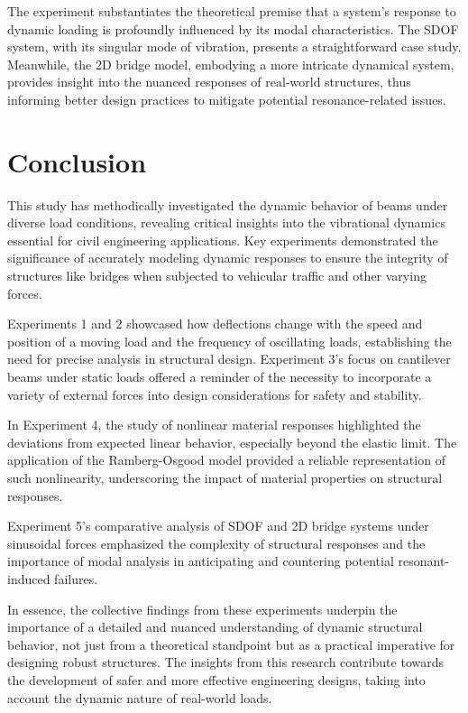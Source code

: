 \documentclass[conference]{IEEEtran}
\begin{document}
The experiment substantiates the theoretical premise that a system's response to dynamic loading is profoundly influenced by its modal characteristics. The SDOF system, with its singular mode of vibration, presents a straightforward case study. Meanwhile, the 2D bridge model, embodying a more intricate dynamical system, provides insight into the nuanced responses of real-world structures, thus informing better design practices to mitigate potential resonance-related issues.


\section{Conclusion}
This study has methodically investigated the dynamic behavior of beams under diverse load conditions, revealing critical insights into the vibrational dynamics essential for civil engineering applications. Key experiments demonstrated the significance of accurately modeling dynamic responses to ensure the integrity of structures like bridges when subjected to vehicular traffic and other varying forces.

Experiments 1 and 2 showcased how deflections change with the speed and position of a moving load and the frequency of oscillating loads, establishing the need for precise analysis in structural design. Experiment 3's focus on cantilever beams under static loads offered a reminder of the necessity to incorporate a variety of external forces into design considerations for safety and stability.

In Experiment 4, the study of nonlinear material responses highlighted the deviations from expected linear behavior, especially beyond the elastic limit. The application of the Ramberg-Osgood model provided a reliable representation of such nonlinearity, underscoring the impact of material properties on structural responses.

Experiment 5's comparative analysis of SDOF and 2D bridge systems under sinusoidal forces emphasized the complexity of structural responses and the importance of modal analysis in anticipating and countering potential resonant-induced failures.

In essence, the collective findings from these experiments underpin the importance of a detailed and nuanced understanding of dynamic structural behavior, not just from a theoretical standpoint but as a practical imperative for designing robust structures. The insights from this research contribute towards the development of safer and more effective engineering designs, taking into account the dynamic nature of real-world loads.
\end{document}
